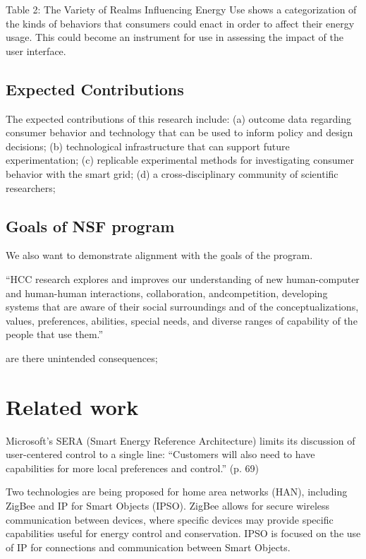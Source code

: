 Table 2: The Variety of Realms Influencing Energy Use shows a
categorization of the kinds of behaviors that consumers could enact in
order to affect their energy usage.  This could become an instrument for
use in assessing the impact of the user interface. 


\subsection{Expected Contributions}

The expected contributions of this research include: (a) outcome data
regarding consumer behavior and technology that can be used to inform
policy and design decisions; (b) technological infrastructure that can
support future experimentation; (c) replicable experimental methods for
investigating consumer behavior with the smart grid; (d) a
cross-disciplinary community of scientific researchers; 


\subsection{Goals of NSF program}

We also want to demonstrate alignment with the goals of the program.

``HCC research explores and improves our understanding of new
human-computer and human-human interactions, collaboration, andcompetition, developing systems that are aware of their social surroundings
and of the conceptualizations, values, preferences, abilities, special
needs, and diverse ranges of capability of the people that use them.''


are there unintended consequences;




\section{Related work}

Microsoft's SERA (Smart Energy Reference Architecture) limits its
discussion of user-centered control to a single line: ``Customers will also
need to have capabilities for more local preferences and control.''
(p. 69)

Two technologies are being proposed for home area networks (HAN), including ZigBee and IP for Smart Objects (IPSO).
ZigBee allows for secure wireless communication between devices, where specific devices may provide specific capabilities useful for energy control and conservation.
IPSO is focused on the use of IP for connections and communication between Smart Objects.


